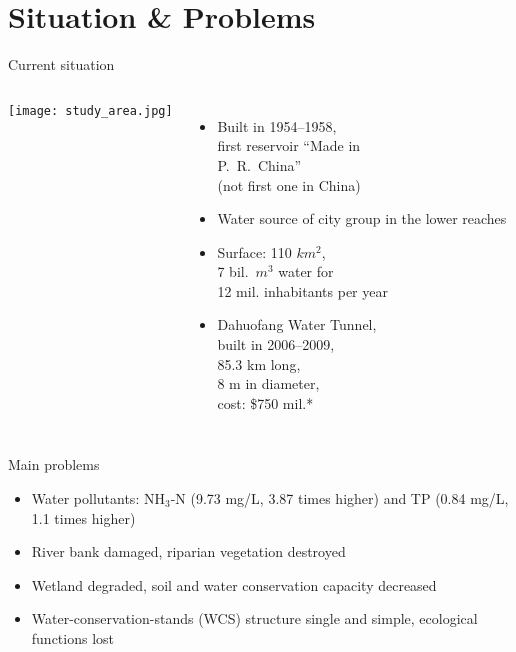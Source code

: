 \section{Situation \& Problems}
{
\begin{frame}[t]{Current situation}
\begin{columns}[T]
\texttt{[image: study\_area.jpg]}
	\begin{itemize}
		\item Built in 1954--1958,\\first reservoir ``Made in\\ P.\ R.\ China''\\(not first one in China)
		\item Water source of city group in the lower reaches		
		\item Surface: 110 $km^2$,\\ 7 bil.\ $m^3$ water for\\ \alert{12 mil.} inhabitants per year
		\item Dahuofang Water Tunnel,\\built in 2006--2009,\\85.3 km long,\\8 m in diameter,\\\alert{cost: \$750 mil.}*
	\end{itemize}
\end{columns}
 \end{frame}
}

\begin{frame}[t]{Main problems}
	\begin{itemize}[<+- | alert@+>]
		\item Water pollutants: NH$_3$-N (9.73 mg/L, 3.87 times higher) and TP (0.84 mg/L, 1.1 times higher)
		\item River bank damaged, riparian vegetation destroyed
		\item Wetland degraded, soil and water conservation capacity decreased
		\item Water-conservation-stands (WCS) structure single and simple, ecological functions lost
	\end{itemize}

\begin{columns}[T]
		
	
\end{columns}
\end{frame}
